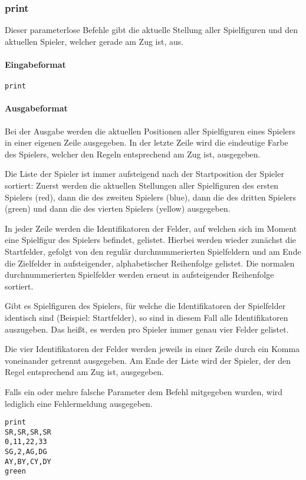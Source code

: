 \documentclass[
  name=\assignment,
  start=\releasedate,
  end=\duedate,
  subject=\lecture\,--\,\semester,
  group=\group,
  url=\theurl,
  author=\authors,
  mail=\themail
]{assignment}
\newcommand{\code}[1]{\colorbox{codegray}{\texttt{#1}}}
\begin{document}
\subsubsection*{print}
Dieser parameterlose Befehle gibt die aktuelle Stellung aller Spielfiguren und den aktuellen Spieler, welcher gerade am Zug ist, aus.
\paragraph{Eingabeformat}
\code{print}
\paragraph{Ausgabeformat}
Bei der Ausgabe werden die aktuellen Positionen aller Spielfiguren eines Spielers in einer eigenen Zeile ausgegeben. In der letzte Zeile wird die eindeutige Farbe des Spielers, welcher den Regeln entsprechend am Zug ist, ausgegeben.

Die Liste der Spieler ist immer aufsteigend nach der Startposition der Spieler sortiert: Zuerst werden die aktuellen Stellungen aller Spielfiguren des ersten Spielers (red), dann die des zweiten Spielers (blue), dann die des dritten Spielers (green) und dann die des vierten Spielers (yellow) ausgegeben.

In jeder Zeile werden die Identifikatoren der Felder, auf welchen sich im Moment eine Spielfigur des Spielers befindet, gelistet. Hierbei werden wieder zunächst die Startfelder, gefolgt von den regulär durchnummerierten Spielfeldern und am Ende die Zielfelder in aufsteigender, alphabetischer Reihenfolge gelistet. Die normalen durchnummerierten Spielfelder werden erneut in aufsteigender Reihenfolge sortiert.

Gibt es Spielfiguren des Spielers, für welche die Identifikatoren der Spielfelder identisch sind (Beispiel: Startfelder), so sind in diesem Fall alle Identifikatoren auszugeben. Das heißt, es werden pro Spieler immer genau vier Felder gelistet.

Die vier Identifikatoren der Felder werden jeweils in einer Zeile durch ein Komma voneinander getrennt ausgegeben. Am Ende der Liste wird der Spieler, der den Regel entsprechend am Zug ist, ausgegeben.

Falls ein oder mehre falsche Parameter dem Befehl mitgegeben wurden, wird lediglich eine Fehlermeldung ausgegeben.
\begin{tcolorbox}[title=Beispiel]
\begin{verbatim}
print
SR,SR,SR,SR
0,11,22,33
SG,2,AG,DG
AY,BY,CY,DY
green
\end{verbatim}
\end{tcolorbox}
\end{document}
